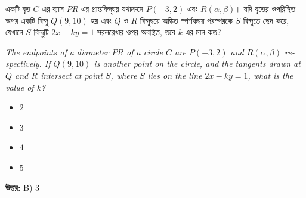 \documentclass[12pt, a4paper]{article}
\begin{document}
\begin{tcolorbox}[questionbox={প্রশ্ন (Question) 44}]
    \noindent
    একটি বৃত্ত $C$ এর ব্যাস $PR$ এর প্রান্তবিন্দুদ্বয় যথাক্রমে $P(-3, 2)$ এবং $R(\alpha, \beta)$। যদি বৃত্তের ওপরিস্থিত অপর একটি বিন্দু $Q(9, 10)$ হয় এবং $Q$ ও $R$ বিন্দুদ্বয়ে অঙ্কিত স্পর্শকদ্বয় পরস্পরকে $S$ বিন্দুতে ছেদ করে, যেখানে $S$ বিন্দুটি $2x - ky = 1$ সরলরেখার ওপর অবস্থিত, তবে $k$ এর মান কত?
    
    \vspace{0.8em}
    \begin{english}
    \noindent\textit{\color{darkgray}
    The endpoints of a diameter $PR$ of a circle $C$ are $P(-3, 2)$ and $R(\alpha, \beta)$ respectively. If $Q(9, 10)$ is another point on the circle, and the tangents drawn at $Q$ and $R$ intersect at point $S$, where $S$ lies on the line $2x - ky = 1$, what is the value of $k$?
    }
    \end{english}
\end{tcolorbox}

\begin{itemize}[label={}, leftmargin=1cm, itemsep=0.5em]
    \item[\textbf{A)}] $2$
    \item[\textbf{B)}] $3$
    \item[\textbf{C)}] $4$
    \item[\textbf{D)}] $5$
\end{itemize}

\vspace{0.5em}
\begin{tcolorbox}[answerbox]
    \textbf{\color{success} উত্তর:} B) $3$
\end{tcolorbox}
\vspace{1em}
\end{document}

